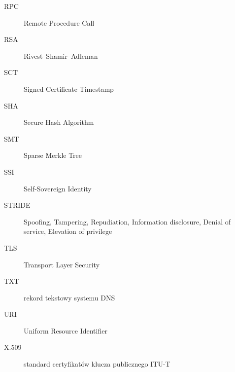 \begin{description}
    \item[RPC] Remote Procedure Call
    \item[RSA] Rivest--Shamir--Adleman
    \item[SCT] Signed Certificate Timestamp
    \item[SHA] Secure Hash Algorithm
    \item[SMT] Sparse Merkle Tree
    \item[SSI] Self-Sovereign Identity
    \item[STRIDE] Spoofing, Tampering, Repudiation, Information disclosure, Denial of service, Elevation of privilege
    \item[TLS] Transport Layer Security
    \item[TXT] rekord tekstowy systemu DNS
    \item[URI] Uniform Resource Identifier
    \item[X.509] standard certyfikatów klucza publicznego ITU-T
\end{description}
